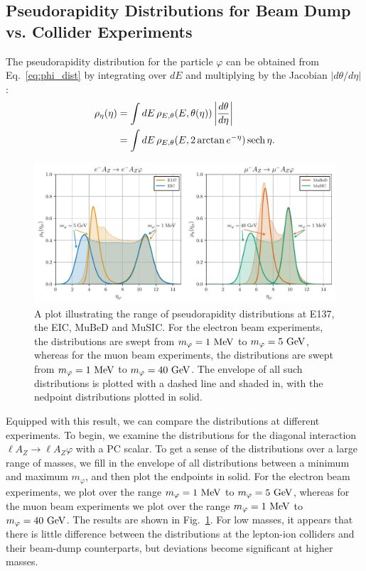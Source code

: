 \subsection{Pseudorapidity Distributions for Beam Dump vs. Collider Experiments}\label{sec:phi_eta}
The pseudorapidity distribution for the particle $\varphi$ can be obtained from Eq.~\ref{eq:phi_dist} by integrating over $dE$ and multiplying by the Jacobian $|d\theta/d\eta|$:
\begin{align}
    \rho_\eta(\eta) &= \int{dE\, \rho_{E,\theta}(E, \theta(\eta))}\left|\frac{d\theta}{d\eta}\right| \nonumber\\
    &= \int{dE\,\rho_{E,\theta}(E,2\arctan{e^{-\eta}})}\,{\rm sech}{\,\eta}.
\end{align}
\begin{figure}[t!]
    \centering
    \includegraphics[width=\linewidth]{figures/chapter4/eta_distributions_diagonal.pdf}
    \caption[Pseudo-rapidity distributions of scalars produced at various lepton-nucleus collision experiments.]{A plot illustrating the range of pseudorapidity distributions at E137, the EIC, MuBeD and MuSIC. For the electron beam experiments, the distributions are swept from $m_\varphi=1~{\rm MeV}$ to $m_\varphi = 5~{\rm GeV}$, whereas for the muon beam experiments, the distributions are swept from $m_\varphi=1~{\rm MeV}$ to $m_\varphi = 40~{\rm GeV}$. The envelope of all such distributions is plotted with a dashed line and shaded in, with the nedpoint distributions plotted in solid.}    \label{fig:eta_distributions_diagonal}
\end{figure}
Equipped with this result, we can compare the distributions at different experiments. To begin, we examine the distributions for the diagonal interaction $\ell A_Z \rightarrow \ell A_Z\varphi$ with a PC scalar. To get a sense of the distributions over a large range of masses, we fill in the envelope of all distributions between a minimum and maximum $m_\varphi$, and then plot the endpoints in solid. For the electron beam experiments, we plot over the range $m_\varphi = 1~{\rm MeV}$ to $m_{\varphi} = 5~{\rm GeV}$, whereas for the muon beam experiments we plot over the range $m_\varphi = 1~{\rm MeV}$ to $m_{\varphi} = 40~{\rm GeV}$. The results are shown in Fig.~\ref{fig:eta_distributions_diagonal}. For low masses, it appears that there is little difference between the distributions at the lepton-ion colliders and their beam-dump counterparts, but deviations become significant at higher masses. 

